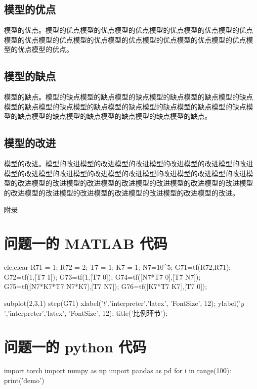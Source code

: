 \documentclass{MMCStyle}
\begin{document}
	\subsection{模型的优点}
	模型的优点。模型的优点模型的优点模型的优点模型的优点模型的优点模型的优点模型的优点模型的优点模型的优点模型的优点模型的优点模型的优点模型的优点模型的优点模型的优点。
	\subsection{模型的缺点}
	模型的缺点。模型的缺点模型的缺点模型的缺点模型的缺点模型的缺点模型的缺点模型的缺点模型的缺点模型的缺点模型的缺点模型的缺点模型的缺点模型的缺点模型的缺点模型的缺点模型的缺点模型的缺点模型的缺点模型的缺点。
	\subsection{模型的改进}
	模型的改进。模型的改进模型的改进模型的改进模型的改进模型的改进模型的改进模型的改进模型的改进模型的改进模型的改进模型的改进模型的改进模型的改进模型的改进模型的改进模型的改进模型的改进模型的改进模型的改进模型的改进模型的改进模型的改进模型的改进模型的改进模型的改进模型的改进模型的改进。

	

	\newpage
	\appendix
	\begin{center}
		\heiti{} 附\hspace{1pc}录
	\end{center}
	\section{问题一的 MATLAB 代码}
	
 \begin{matlab}
    clc,clear
    R71 = 1;
    R72 = 2;
    T7 = 1;
    K7 = 1;
    N7=10^5;
    G71=tf(R72,R71);
    G72=tf(1,[T7 1]);
    G73=tf(1,[T7 0]);
    G74=tf([N7*T7 0],[T7 N7]);
    G75=tf([N7*K7*T7 N7*K7],[T7 N7]);
    G76=tf([K7*T7 K7],[T7 0]);
    
    subplot(2,3,1)
    step(G71)
    xlabel('$t$','interpreter','latex', 'FontSize', 12);
    ylabel('$y$','interpreter','latex', 'FontSize', 12);
    title('比例环节');
	
 \end{matlab}
 \section{问题一的 python 代码}
  \begin{python}
      import torch
      import numpy as np
      import pandas as pd
      for i in range(100):
          print('demo')
  \end{python}
\end{document}
